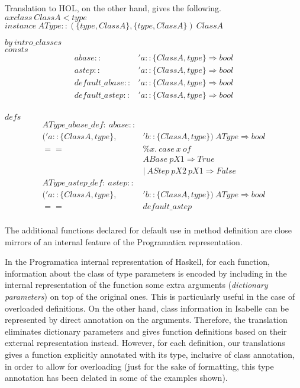 \documentclass{llncs}
\begin{document}
\noindent Translation to HOL, on the other hand, gives the following.\\

\noindent $axclass \ ClassA < type$\\

\noindent $instance \ AType::(\{type, ClassA\}, \{type, ClassA\}) \ ClassA$ 

$by \ intro\_classes$\\

\noindent $consts$
$$\begin{array}{ll}
abase :: & 'a::\{ClassA, type\} \Rightarrow bool\\
astep :: & 'a::\{ClassA, type\} \Rightarrow bool\\
default\_abase :: & 'a::\{ClassA, type\} \Rightarrow bool\\
default\_astep :: & 'a::\{ClassA, type\} \Rightarrow bool\\
\end{array}$$

\noindent $defs$
$$\begin{array}{rl}
AType\_abase\_def : \ abase :: & \\
    ('a::\{ClassA, type\}, & 'b::\{ClassA, type\}) \ AType \Rightarrow bool \\
                                   == & \% x. \ case \ x \ of \\
                                   &  ABase \ pX1 \Rightarrow True  \\
                                   &  | \ AStep \ pX2 \ pX1 \Rightarrow False \\
AType\_astep\_def : \ astep :: & \\
      ('a::\{ClassA, type\}, & 'b::\{ClassA, type\}) \ AType \Rightarrow bool \\
      == & default\_astep\\
\end{array}$$

\noindent
The additional functions declared for default use in method definition are
close mirrors of an internal feature of the Programatica representation.

In the Programatica internal representation of Haskell, for each function,
information about the class of type parameters is encoded by including in the
internal representation of the function some extra arguments (\emph{dictionary
  parameters}) on top of the original ones. This is particularly useful in the
case of overloaded definitions. On the other hand, class information in
Isabelle can be represented by direct annotation on the arguments. Therefore,
the translation eliminates dictionary parameters and gives function
definitions based on their external representation instead. However, for each
definition, our translations gives a function explicitly annotated with its
type, inclusive of class annotation, in order to allow for overloading (just
for the sake of formatting, this type annotation has been delated in some of
the examples shown).
\end{document}
